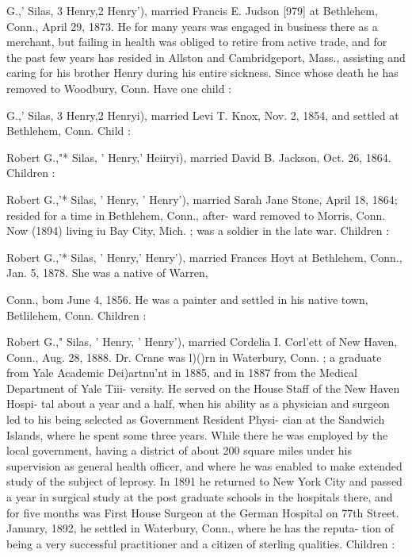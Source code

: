 \documentclass[oneside]{book}
\begin{document}
G.,' Silas, 3 Henry,2 Henry'), married Francis E. Judson [979] 
at Bethlehem, Conn., April 29, 1873. He for many years was 
engaged in business there as a merchant, but failing in health was 
obliged to retire from active trade, and for the past few years 
has resided in Allston and Cambridgeport, Mass., assisting and 
caring for his brother Henry during his entire sickness. Since 
whose death he has removed to Woodbury, Conn. Have one 
child : 


G.,' Silas, 3 Henry,2 Henryi), married Levi T. Knox, Nov. 2, 
1854, and settled at Bethlehem, Conn. Child : 


Robert G.,"* Silas, ' Henry,' Heiiryi), married David B. Jackson, 
Oct. 26, 1864. Children : 




Robert G.,'* Silas, ' Henry, ' Henry'), married Sarah Jane Stone, 
April 18, 1864; resided for a time in Bethlehem, Conn., after- 
ward removed to Morris, Conn. Now (1894) living iu Bay City, 
Mich. ; was a soldier in the late war. Children : 


Robert G.,'* Silas, ' Henry,' Henry'), married Frances Hoyt at 
Bethlehem, Conn., Jan. 5, 1878. She was a native of Warren, 




Conn., bom June 4, 1856. He was a painter and settled in his 
native town, Betlilehem, Conn. Children : 






Robert G.," Silas, ' Henry, ' Henry'), married Cordelia I. Corl'ett 
of New Haven, Conn., Aug. 28, 1888. Dr. Crane was l)()rn in 
Waterbury, Conn. ; a graduate from Yale Academic Dei)artnu'nt 
in 1885, and in 1887 from the Medical Department of Yale Tiii- 
versity. He served on the House Staff of the New Haven Hospi- 
tal about a year and a half, when his ability as a physician and 
surgeon led to his being selected as Government Resident Physi- 
cian at the Sandwich Islands, where he spent some three years. 
While there he was employed by the local government, having a 
district of about 200 square miles under his supervision as general 
health officer, and where he was enabled to make extended study 
of the subject of leprosy. In 1891 he returned to New York 
City and passed a year in surgical study at the post graduate 
schools in the hospitals there, and for five months was First 
House Surgeon at the German Hospital on 77th Street. January, 
1892, he settled in Waterbury, Conn., where he has the reputa- 
tion of being a very successful practitioner and a citizen of 
sterling qualities. Children : 
\end{document}
